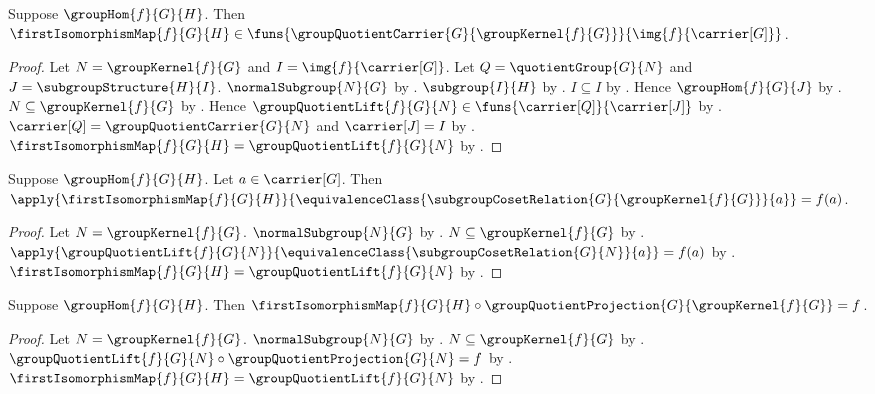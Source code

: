 \begin{proposition}\label{first_isomorphism_map_type}
    Suppose $\groupHom{f}{G}{H}$.
    Then $\firstIsomorphismMap{f}{G}{H}\in
        \funs{
            \groupQuotientCarrier{G}{\groupKernel{f}{G}}}
            {\img{f}{\carrier[G]}}$.
\end{proposition}
\begin{proof}
    Let $N=\groupKernel{f}{G}$ and
        $I=\img{f}{\carrier[G]}$.
    Let $Q=\quotientGroup{G}{N}$ and
        $J=\subgroupStructure{H}{I}$.
    $\normalSubgroup{N}{G}$ by .
    $\subgroup{I}{H}$ by .
    $I\subseteq I$ by .
    Hence $\groupHom{f}{G}{J}$ by
        .
    $N\subseteq\groupKernel{f}{G}$ by .
    Hence $\groupQuotientLift{f}{G}{N}\in
        \funs{\carrier[Q]}{\carrier[J]}$ by
        .
    $\carrier[Q]=\groupQuotientCarrier{G}{N}$ and
        $\carrier[J]=I$ by
        .
    $\firstIsomorphismMap{f}{G}{H}=
        \groupQuotientLift{f}{G}{N}$ by
        .
\end{proof}

\begin{proposition}\label{first_isomorphism_map_apply}
    Suppose $\groupHom{f}{G}{H}$.
    Let $a\in\carrier[G]$.
    Then
        $\apply{\firstIsomorphismMap{f}{G}{H}}
            {\equivalenceClass
                {\subgroupCosetRelation{G}{\groupKernel{f}{G}}}
                {a}}=f(a)$.
\end{proposition}
\begin{proof}
    Let $N=\groupKernel{f}{G}$.
    $\normalSubgroup{N}{G}$ by .
    $N\subseteq\groupKernel{f}{G}$ by .
    $\apply{\groupQuotientLift{f}{G}{N}}
        {\equivalenceClass{\subgroupCosetRelation{G}{N}}{a}}
        =f(a)$ by .
    $\firstIsomorphismMap{f}{G}{H}=
        \groupQuotientLift{f}{G}{N}$ by
        .
\end{proof}

\begin{theorem}\label{first_isomorphism_map_factorization}
    Suppose $\groupHom{f}{G}{H}$.
    Then
        $\firstIsomorphismMap{f}{G}{H}\circ
            \groupQuotientProjection
                {G}{\groupKernel{f}{G}}=f$.
\end{theorem}
\begin{proof}
    Let $N=\groupKernel{f}{G}$.
    $\normalSubgroup{N}{G}$ by .
    $N\subseteq\groupKernel{f}{G}$ by .
    $\groupQuotientLift{f}{G}{N}\circ
        \groupQuotientProjection{G}{N}=f$ by
        .
    $\firstIsomorphismMap{f}{G}{H}=
        \groupQuotientLift{f}{G}{N}$ by
        .
\end{proof}

